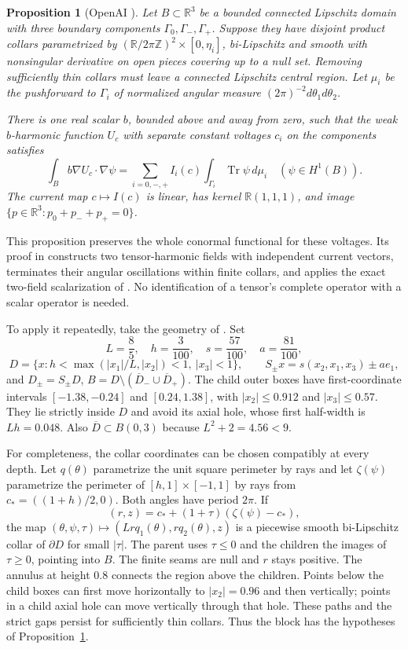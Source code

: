 \documentclass[10pt]{article}
\newtheorem{proposition}[theorem]{Proposition}
\newcommand{\R}{\mathbb R}
\newcommand{\Tr}{\operatorname{Tr}}
\begin{document}
\begin{proposition}[OpenAI {\cite[Proposition 4.1]{oai}}]\label{prop:block}
Let $B\subset\R^3$ be a bounded connected Lipschitz domain with three boundary components $\Gamma_0,\Gamma_-,\Gamma_+$. Suppose they have disjoint product collars parametrized by $(\R/2\pi\mathbb Z)^2\times[0,\eta_i]$, bi-Lipschitz and smooth with nonsingular derivative on open pieces covering up to a null set. Removing sufficiently thin collars must leave a connected Lipschitz central region. Let $\mu_i$ be the pushforward to $\Gamma_i$ of normalized angular measure $(2\pi)^{-2}d\theta_1d\theta_2$.

There is one real scalar $b$, bounded above and away from zero, such that the weak $b$-harmonic function $U_c$ with separate constant voltages $c_i$ on the components satisfies
\begin{equation}\label{eq:block}
\int_B b\nabla U_c\cdot\nabla\psi
=\sum_{i=0,-,+} I_i(c)\int_{\Gamma_i}\Tr\psi\,d\mu_i
\quad(\psi\in H^1(B)).
\end{equation}
The current map $c\mapsto I(c)$ is linear, has kernel $\R(1,1,1)$, and image $\{p\in\R^3:p_0+p_-+p_+=0\}$.
\end{proposition}
This proposition preserves the whole conormal functional for these voltages. Its proof in \cite[pp.16--25]{oai} constructs two tensor-harmonic fields with independent current vectors, terminates their angular oscillations within finite collars, and applies the exact two-field scalarization of \cite[Theorem 3.1]{oai}. No identification of a tensor's complete operator with a scalar operator is needed.

To apply it repeatedly, take the geometry of \cite[Lemma 5.1]{oai}. Set
\[
L=\frac85,\quad h=\frac3{100},\quad s=\frac{57}{100},\quad a=\frac{81}{100},
\]
\[
D=\{x:h<\max(|x_1|/L,|x_2|)<1,\ |x_3|<1\},\qquad
S_\pm x=s(x_2,x_1,x_3)\pm ae_1,
\]
and $D_\pm=S_\pm D$, $B=D\setminus(\overline D_-\cup\overline D_+)$. The child outer boxes have first-coordinate intervals $[-1.38,-0.24]$ and $[0.24,1.38]$, with $|x_2|\leq0.912$ and $|x_3|\leq0.57$. They lie strictly inside $D$ and avoid its axial hole, whose first half-width is $Lh=0.048$. Also $\overline D\subset B(0,3)$ because $L^2+2=4.56<9$.

For completeness, the collar coordinates can be chosen compatibly at every depth. Let $q(\theta)$ parametrize the unit square perimeter by rays and let $\zeta(\psi)$ parametrize the perimeter of $[h,1]\times[-1,1]$ by rays from $c_* =((1+h)/2,0)$. Both angles have period $2\pi$. If
\[
(r,z)=c_*+(1+\tau)(\zeta(\psi)-c_*),
\]
the map $(\theta,\psi,\tau)\mapsto(Lr q_1(\theta),r q_2(\theta),z)$ is a piecewise smooth bi-Lipschitz collar of $\partial D$ for small $|\tau|$. The parent uses $\tau\leq0$ and the children the images of $\tau\geq0$, pointing into $B$. The finite seams are null and $r$ stays positive. The annulus at height $0.8$ connects the region above the children. Points below the child boxes can first move horizontally to $|x_2|=0.96$ and then vertically; points in a child axial hole can move vertically through that hole. These paths and the strict gaps persist for sufficiently thin collars. Thus the block has the hypotheses of Proposition~\ref{prop:block}.
\end{document}
